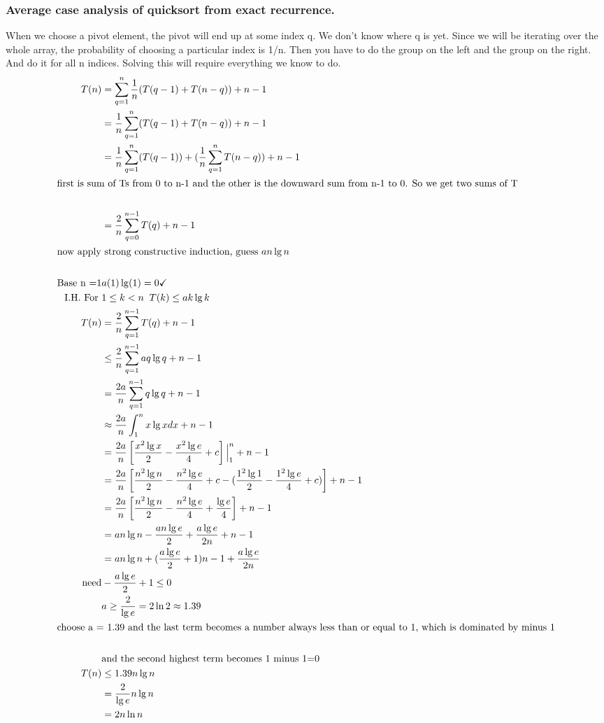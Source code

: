 \documentclass[english, 10pt]{article}
\begin{document}
\subsubsection{Average case analysis of quicksort from exact recurrence.}
When we choose a pivot element, the pivot will end up at some index q. We don't know where q is yet.
Since we will be iterating over the whole array, the probability of choosing a particular index is 1/n.
Then you have to do the group on the left and the group on the right. And do it for all n indices.
Solving this will require everything we know to do.
\begin{align*}
T(n) &= \s{q=1}{n}\frac{1}{n}( T(q-1) + T(n-q) ) +n -1  \\
&= \frac{1}{n}\s{q=1}{n}( T(q-1) + T(n-q) ) +n -1  \\ %
&= \frac{1}{n}\s{q=1}{n}( T(q-1)) + (\frac{1}{n}\s{q=1}{n} T(n-q) ) +n -1 \\ %
\intertext{first is sum of Ts from 0 to n-1 and the other is the downward sum from n-1 to 0. So we get two sums of T} \\
&= \frac{2}{n} \s{q=0}{n-1} T(q) + n -1 \\
\intertext{now apply strong constructive induction, guess $an\lg n$} \\
\text{Base n =1} & a(1)\lg(1) = 0 \checkmark \\
\text{I.H. For } & 1\le k<n\;\;T(k) \le ak\lg k \\
T(n) &= \frac{2}{n}\s{q=1}{n-1}T(q) + n-1 \\
&\le \frac{2}{n} \s{q=1}{n-1}aq\lg q + n -1 \\
&= \frac{2a}{n} \s{q=1}{n-1} q\lg q + n -1 \\
&\approx \frac{2a}{n} \int_{1}^{n} x\lg x dx   + n -1 \\
&= \frac{2a}{n} \left[ \frac{x^2 \lg x }{2} - \frac{x^2 \lg e}{4} +c \right] \Big|_1^n +n -1 \\
&= \frac{2a}{n} \left[ \frac{n^2 \lg n }{2} - \frac{n^2 \lg e}{4} +c - (\frac{1^2 \lg 1 }{2} - \frac{1^2 \lg e}{4} +c ) \right]  +n -1 \\
&= \frac{2a}{n} \left[ \frac{n^2 \lg n }{2} - \frac{n^2 \lg e}{4} + \frac{\lg e}{4} \right]  +n -1 \\
&= an\lg n - \frac{an\lg e }{2} + \frac{a\lg e}{2n} +n -1\\
&= an\lg n + (\frac{a\lg e}{2}+1)n -1 + \frac{a\lg e}{2n} \\
\text{need}& -\frac{a \lg e }{2}+1 \le 0 \\
& a \ge \frac{2}{\lg e} = 2 \ln 2 \approx 1.39 \\
\intertext{choose a = 1.39 and the last term becomes a number always less than or equal to 1, which is dominated by minus 1} \\
&\text{and the second highest term becomes 1 minus 1=0} \\
T(n) &\le 1.39n\lg n \\
&= \frac{2}{\lg e}n\lg n \\
&= 2n \ln n \\
\end{align*}
\end{document}
